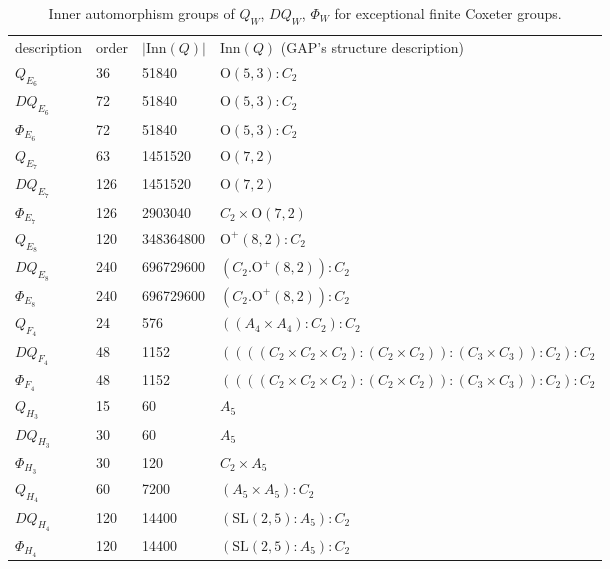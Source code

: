 \documentclass{amsart}
\theoremstyle{definition}
\theoremstyle{remark}
\numberwithin{equation}{section}
\begin{document}
\begin{table}
\caption{Inner automorphism groups of $Q_W$, $DQ_W$, $\Phi_W$ for exceptional finite Coxeter groups.}
\begin{tabular}{l|l|l|l}
description & order & $|\mathrm{Inn} (Q)|$ & $\mathrm{Inn}(Q)$ (GAP's structure description) \\
\Xhline{1pt}
$Q_{E_6}$ & 36 & 51840 & $\mathrm{O}(5,3) : C_2$ \\ \hline
$DQ_{E_6}$ & 72 & 51840 & $\mathrm{O}(5,3) : C_2$ \\ \hline
$\Phi_{E_6}$ & 72 & 51840 & $\mathrm{O}(5,3) : C_2$ \\ \Xhline{1pt}
$Q_{E_7}$ & 63 & 1451520 & $\mathrm{O}(7,2)$ \\ \hline
$DQ_{E_7}$ & 126 & 1451520 & $\mathrm{O}(7,2)$ \\ \hline
$\Phi_{E_7}$ & 126 & 2903040 & $C_2 \times \mathrm{O(7,2)}$ \\ \Xhline{1pt}
$Q_{E_8}$ & 120 & 348364800 & $\mathrm{O}^+(8,2) : C_2$ \\ \hline
$DQ_{E_8}$ & 240 & 696729600 & $(C_2 . \mathrm{O}^+(8,2)) : C_2$ \\ \hline
$\Phi_{E_8}$ & 240 & 696729600 & $(C_2 . \mathrm{O}^+(8,2)) : C_2$ \\ \Xhline{1pt}
$Q_{F_4}$ & 24 & 576 & $((A_4 \times A_4) : C_2) : C_2$ \\ \hline
$DQ_{F_4}$ & 48 & 1152 & $((((C_2 \times C_2 \times C_2) : (C_2 \times C_2)) : (C_3 \times C_3)) : C_2) : C_2$ \\ \hline
$\Phi_{F_4}$ & 48 & 1152 & $((((C_2 \times C_2 \times C_2) : (C_2 \times C_2)) : (C_3 \times C_3)) : C_2) : C_2$ \\ \Xhline{1pt}
$Q_{H_3}$ & 15 & 60 & $A_5$ \\ \hline
$DQ_{H_3}$ & 30 & 60 & $A_5$ \\ \hline
$\Phi_{H_3}$ & 30 & 120 & $C_2 \times A_5$ \\ \Xhline{1pt}
$Q_{H_4}$ & 60 & 7200 & $(A_5 \times A_5) : C_2$ \\ \hline
$DQ_{H_4}$ & 120 & 14400 & $(\mathrm{SL}(2,5) : A_5) : C_2$ \\ \hline
$\Phi_{H_4}$ & 120 & 14400 & $(\mathrm{SL}(2,5) : A_5) : C_2$ \\ 
\end{tabular}
\label{table:exceptional}
\end{table}
\end{document}
